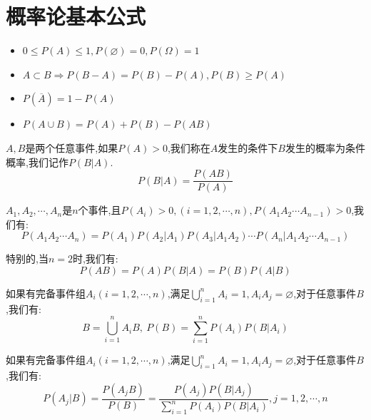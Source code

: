 \section{概率论基本公式}
\begin{definition}[性质和基本公式]
	\begin{itemize}
		\item $0\leq P(A)\leq 1,P(\varnothing)=0,P(\Omega)=1$
		\item $A\subset B\Rightarrow P(B-A)=P(B)-P(A),P(B)\geq P(A)$
		\item $P(\overline{A})=1-P(A)$
		\item $P(A\cup B)=P(A)+P(B)-P(AB)$
	\end{itemize}
\end{definition}
\begin{definition}[公式]
	\begin{theorem}[条件概率公式]
		$A,B$是两个任意事件,如果$P(A)>0$,我们称在$A$发生的条件下$B$发生的概率为条件概率,我们记作$P(B|A)$.
		$$P(B|A)=\dfrac{P(AB)}{P(A)}$$
	\end{theorem}
	\begin{theorem}[乘法公式]
		$A_{1},A_{2},\cdots,A_{n}$是$n$个事件,且$P(A_{i})>0,(i=1,2,\cdots,n),P(A_{1}A_{2}\cdots A_{n-1})>0$,我们有: 
		$$P(A_{1}A_{2}\cdots A_{n})=P(A_{1})P(A_{2}|A_{1})P(A_{3}|A_{1}A_{2})\cdots P(A_{n}|A_{1}A_{2}\cdots A_{n-1})$$
		
		特别的,当$n=2$时,我们有: 
		$$P(AB)=P(A)P(B|A)=P(B)P(A|B)$$
	\end{theorem}
	\begin{theorem}[全概率公式]
		如果有完备事件组$A_{i}(i=1,2,\cdots,n)$,满足$\bigcup_{i=1}^{n}A_{i}=1,A_{i}A_{j}=\varnothing$,对于任意事件$B$,我们有: 
		$$B=\bigcup_{i=1}^{n}A_{i}B,\ P(B)=\sum\limits_{i=1}^{n}P(A_{i})P(B|A_{i})$$
	\end{theorem}
	\begin{theorem}[贝叶斯公式]
		如果有完备事件组$A_{i}(i=1,2,\cdots,n)$,满足$\bigcup_{i=1}^{n}A_{i}=1,A_{i}A_{j}=\varnothing$,对于任意事件$B$,我们有: 
		$$P(A_{j}|B)=\dfrac{P(A_{j}B)}{P(B)}=\dfrac{P(A_{j})P(B|A_{j})}{\sum\limits_{i=1}^{n}P(A_{i})P(B|A_{i})},j=1,2,\cdots,n$$
	\end{theorem}
\end{definition}
